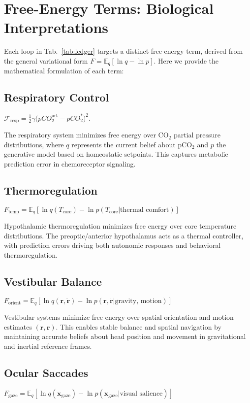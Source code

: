 \documentclass[10pt]{article}
\newcommand{\precision}{\gamma}        %
\newcommand{\FreeE}{\mathcal F}        %
\begin{document}
\section{Free-Energy Terms: Biological Interpretations}

Each loop in Tab.~\ref{tab:ledger} targets a distinct free-energy term, derived from the general variational form $F = \mathbb{E}_q[\ln q - \ln p]$. Here we provide the mathematical formulation of each term:

\subsection{Respiratory Control}
$\FreeE_{\text{resp}}=\tfrac12\precision\bigl(pCO_2^{\text{art}}-pCO_2^{*}\bigr)^2.$

The respiratory system minimizes free energy over CO$_2$ partial pressure distributions, where $q$ represents the current belief about pCO$_2$ and $p$ the generative model based on homeostatic setpoints. This captures metabolic prediction error in chemoreceptor signaling.

\subsection{Thermoregulation}
$F_{\text{temp}} = \mathbb{E}_q[\ln q(T_{\text{core}}) - \ln p(T_{\text{core}}|\text{thermal comfort})]$

Hypothalamic thermoregulation minimizes free energy over core temperature distributions. The preoptic/anterior hypothalamus acts as a thermal controller, with prediction errors driving both autonomic responses and behavioral thermoregulation.

\subsection{Vestibular Balance}
$F_{\text{orient}} = \mathbb{E}_q[\ln q(\mathbf{r}, \dot{\mathbf{r}}) - \ln p(\mathbf{r}, \dot{\mathbf{r}}|\text{gravity, motion})]$

Vestibular systems minimize free energy over spatial orientation and motion estimates $(\mathbf{r}, \dot{\mathbf{r}})$. This enables stable balance and spatial navigation by maintaining accurate beliefs about head position and movement in gravitational and inertial reference frames.

\subsection{Ocular Saccades}
$F_{\text{gaze}} = \mathbb{E}_q[\ln q(\mathbf{x}_{\text{gaze}}) - \ln p(\mathbf{x}_{\text{gaze}}|\text{visual salience})]$
\end{document}
